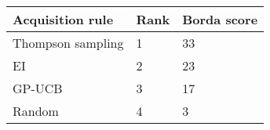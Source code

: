\begin{tabular}{lll}
Acquisition rule & Rank & Borda score \\ 
\hline 
Thompson sampling & 1 & 33 \\ 
EI & 2 & 23 \\ 
GP-UCB & 3 & 17 \\ 
Random & 4 & 3 \\ 
\hline 
\end{tabular}